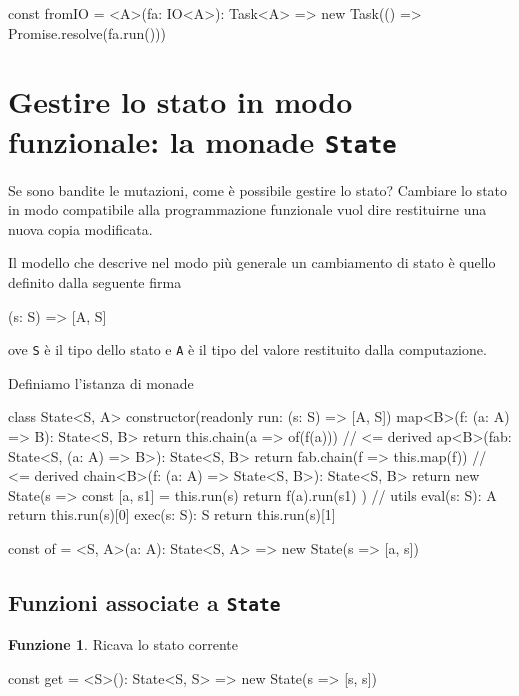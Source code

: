 \documentclass[12pt]{article}
\theoremstyle{definition}
\newtheorem{function}{Funzione}[section]
\newenvironment{code}
  {\vspace{0.5cm} \VerbatimEnvironment\begin{typescriptcode}}
  {\end{typescriptcode} \vspace{0.2cm}}
\begin{document}
\begin{code}
const fromIO = <A>(fa: IO<A>): Task<A> =>
  new Task(() => Promise.resolve(fa.run()))
\end{code}

\newpage

\section{Gestire lo stato in modo funzionale: la monade \texttt{State}}

Se sono bandite le mutazioni, come è possibile gestire lo stato?
Cambiare lo stato in modo compatibile alla programmazione funzionale vuol dire restituirne una nuova copia modificata.

Il modello che descrive nel modo più generale un cambiamento di stato è quello definito dalla seguente firma

\begin{code}
(s: S) => [A, S]
\end{code}

ove \texttt{S} è il tipo dello stato e \texttt{A} è il tipo del valore restituito dalla computazione.

Definiamo l'istanza di monade

\begin{code}
class State<S, A> {
  constructor(readonly run: (s: S) => [A, S]) {}
  map<B>(f: (a: A) => B): State<S, B> {
    return this.chain(a => of(f(a))) // <= derived
  }
  ap<B>(fab: State<S, (a: A) => B>): State<S, B> {
    return fab.chain(f => this.map(f)) // <= derived
  }
  chain<B>(f: (a: A) => State<S, B>): State<S, B> {
    return new State(s => {
      const [a, s1] = this.run(s)
      return f(a).run(s1)
    })
  }
  // utils
  eval(s: S): A {
    return this.run(s)[0]
  }
  exec(s: S): S {
    return this.run(s)[1]
  }
}

const of = <S, A>(a: A): State<S, A> =>
  new State(s => [a, s])
\end{code}

\subsection{Funzioni associate a \texttt{State}}

\begin{function}
Ricava lo stato corrente

\begin{code}
const get = <S>(): State<S, S> =>
  new State(s => [s, s])
\end{code}
\end{function}
\end{document}
